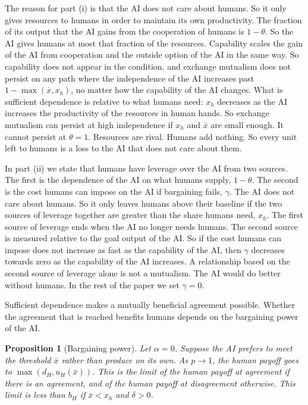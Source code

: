 \documentclass[article, 11pt, reqno]{amsart}
\newtheorem{proposition}[theorem]{Proposition}
\theoremstyle{named}
\newcommand{\bH}{b_H}
\newcommand{\dH}{d_H}
\theoremstyle{plain}
\begin{document}
The reason for part (i) is that the AI does not care about humans. So it only gives resources to humans in order to maintain its own productivity. The fraction of its output that the AI gains from the cooperation of humans is $1-\theta$. So the AI gives humans at most that fraction of the resources. Capability scales the gain of the AI from cooperation and the outside option of the AI in the same way. So capability does not appear in the condition, and exchange mutualism does not persist on any path where the independence of the AI increases past $1 - \max(\bar{x}, x_h)$, no matter how the capability of the AI changes. What is sufficient dependence is relative to what humans need: $x_h$ decreases as the AI increases the productivity of the resources in human hands. So exchange mutualism can persist at high independence if $x_h$ and $\bar{x}$ are small enough. It cannot persist at $\theta = 1$. Resources are rival. Humans add nothing. So every unit left to humans is a loss to the AI that does not care about them.

In part (ii) we state that humans have leverage over the AI from two sources. The first is the dependence of the AI on what humans supply, $1 - \theta$. The second is the cost humans can impose on the AI if bargaining fails, $\gamma$. The AI does not care about humans. So it only leaves humans above their baseline if the two sources of leverage together are greater than the share humans need, $x_h$. The first source of leverage ends when the AI no longer needs humans. The second source is measured relative to the goal output of the AI. So if the cost humans can impose does not increase as fast as the capability of the AI, then $\gamma$ decreases towards zero as the capability of the AI increases. A relationship based on the second source of leverage alone is not a mutualism. The AI would do better without humans. In the rest of the paper we set $\gamma = 0$.

Sufficient dependence makes a mutually beneficial agreement possible. Whether the agreement that is reached benefits humans depends on the bargaining power of the AI.

\begin{proposition}[Bargaining power]\label{prop:extortion}
Let $\alpha = 0$. Suppose the AI prefers to meet the threshold $\bar{x}$ rather than produce on its own. As $p \to 1$, the human payoff goes to $\max(\dH, u_H(\bar{x}))$. This is the limit of the human payoff at agreement if there is an agreement, and of the human payoff at disagreement otherwise. This limit is less than $\bH$ if $\bar{x} < x_h$ and $\delta > 0$.
\end{proposition}
\end{document}
